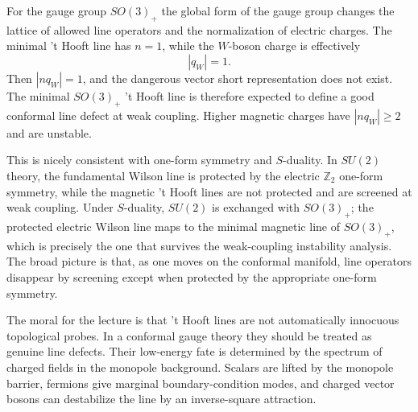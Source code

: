 \documentclass[11pt]{article}
\newcommand{\Z}{\mathbb{Z}}
\begin{document}
For the gauge group $SO(3)_+$ the global form of the gauge group changes the lattice of allowed line operators and the normalization of electric charges.  The minimal 't Hooft line has $n=1$, while the $W$-boson charge is effectively
\begin{equation}
  |q_W|=1 .
\end{equation}
Then $|nq_W|=1$, and the dangerous vector short representation does not exist.  The minimal $SO(3)_+$ 't Hooft line is therefore expected to define a good conformal line defect at weak coupling.  Higher magnetic charges have $|nq_W|\ge2$ and are unstable.

This is nicely consistent with one-form symmetry and $S$-duality.  In $SU(2)$ theory, the fundamental Wilson line is protected by the electric $\Z_2$ one-form symmetry, while the magnetic 't Hooft lines are not protected and are screened at weak coupling.  Under $S$-duality, $SU(2)$ is exchanged with $SO(3)_+$; the protected electric Wilson line maps to the minimal magnetic line of $SO(3)_+$, which is precisely the one that survives the weak-coupling instability analysis.  The broad picture is that, as one moves on the conformal manifold, line operators disappear by screening except when protected by the appropriate one-form symmetry.

The moral for the lecture is that 't Hooft lines are not automatically innocuous topological probes.  In a conformal gauge theory they should be treated as genuine line defects.  Their low-energy fate is determined by the spectrum of charged fields in the monopole background.  Scalars are lifted by the monopole barrier, fermions give marginal boundary-condition modes, and charged vector bosons can destabilize the line by an inverse-square attraction.
\end{document}
